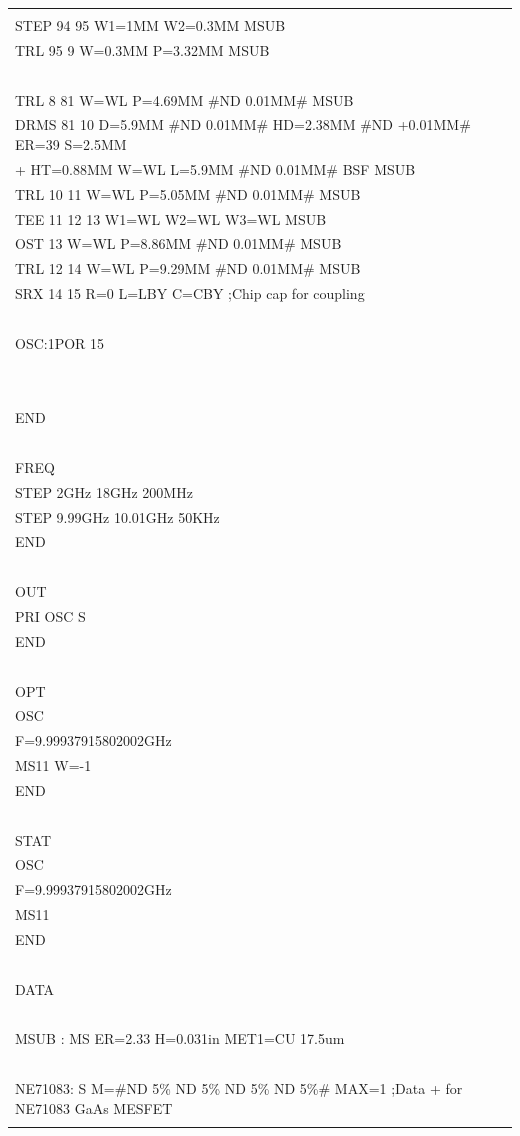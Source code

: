 \begin{longtable}[]{@{}l@{}}
\begin{minipage}[t]{0.97\columnwidth}
\begin{quote}
TRL 93 94 W=1MM P=0.5MM MSUB\\
STEP 94 95 W1=1MM W2=0.3MM MSUB\\
TRL 95 9 W=0.3MM P=3.32MM MSUB\\
~\\
TRL 8 81 W=WL P=4.69MM \#ND 0.01MM\# MSUB\\
DRMS 81 10 D=5.9MM \#ND 0.01MM\# HD=2.38MM \#ND +0.01MM\# ER=39
S=2.5MM\\
+ HT=0.88MM W=WL L=5.9MM \#ND 0.01MM\# BSF MSUB\\
TRL 10 11 W=WL P=5.05MM \#ND 0.01MM\# MSUB\\
TEE 11 12 13 W1=WL W2=WL W3=WL MSUB\\
OST 13 W=WL P=8.86MM \#ND 0.01MM\# MSUB\\
TRL 12 14 W=WL P=9.29MM \#ND 0.01MM\# MSUB\\
SRX 14 15 R=0 L=LBY C=CBY ;Chip cap for coupling\\
~\\
OSC:1POR 15\\
~\\
~\\
END\\
~\\
FREQ\\
STEP 2GHz 18GHz 200MHz\\
STEP 9.99GHz 10.01GHz 50KHz\\
END\\
~\\
OUT\\
PRI OSC S\\
END\\
~\\
OPT\\
OSC\\
F=9.99937915802002GHz\\
MS11 W=-1\\
END\\
~\\
STAT\\
OSC\\
F=9.99937915802002GHz\\
MS11\\
END\\
~\\
DATA\\
~\\
MSUB : MS ER=2.33 H=0.031in MET1=CU 17.5um\\
~\\
NE71083: S M=\#ND 5\% ND 5\% ND 5\% ND 5\%\# MAX=1 ;Data + for NE71083
GaAs MESFET\\

\end{quote}
\end{minipage}
\end{longtable}
